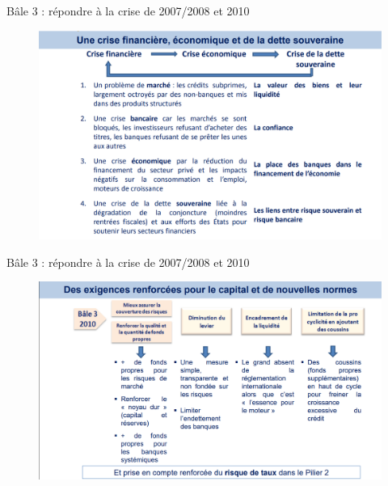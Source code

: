 \begin{frame}{Bâle 3 : répondre à la crise de 2007/2008 et 2010}
    \begin{figure}[h]
        \centering
        \includegraphics[scale=0.4]{Frames/Les Accords de Bale/b3.png}
    \end{figure}
\end{frame}







\begin{frame}{Bâle 3 : répondre à la crise de 2007/2008 et 2010}
    \begin{figure}[h]
        \centering
        \includegraphics[scale=0.43]{Frames/Les Accords de Bale/b6.png}
    \end{figure}
\end{frame}




